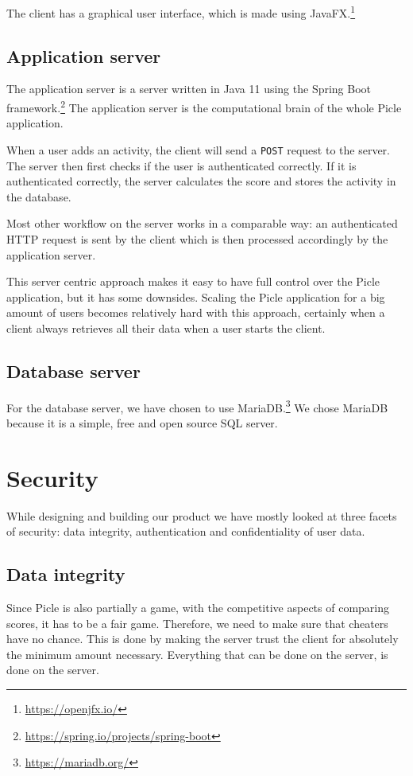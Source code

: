 The client has a graphical user interface, which is made using JavaFX.\footnote{\url{https://openjfx.io/}}

\subsection{Application server}
The application server is a server written in Java 11 using the Spring Boot framework.\footnote{\url{https://spring.io/projects/spring-boot}}
The application server is the computational brain of the whole Picle application.

When a user adds an activity, the client will send a \verb+POST+ request to the server.
The server then first checks if the user is authenticated correctly. If it is authenticated
correctly, the server calculates the score and stores the activity in the database.

Most other workflow on the server works in a comparable way: an authenticated HTTP request
is sent by the client which is then processed accordingly by the application server.

This server centric approach makes it easy to have full control over the Picle application,
but it has some downsides. Scaling the Picle application for a big amount of users becomes
relatively hard with this approach, certainly when a client always retrieves all their
data when a user starts the client.

\subsection{Database server}
For the database server, we have chosen to use MariaDB.\footnote{\url{https://mariadb.org/}}
We chose MariaDB because it is a simple, free and open source SQL server.

\section{Security}
While designing and building our product we have mostly looked at three facets of security:
data integrity, authentication and confidentiality of user data.

\subsection{Data integrity}
Since Picle is also partially a game, with the competitive aspects of comparing scores,
it has to be a fair game. Therefore, we need to make sure that cheaters have no chance.
This is done by making the server trust the client for absolutely the minimum amount
necessary. Everything that can be done on the server, is done on the server.

